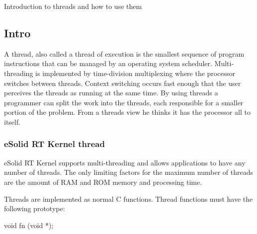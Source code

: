 Introduction to threads and how to use them

\par
\par
\par
\hypertarget{threads_threads_intro}{}\subsection{Intro}\label{threads_threads_intro}
A thread, also called a thread of execution is the smallest sequence of program instructions that can be managed by an operating system scheduler. Multi-\/threading is implemented by time-\/division multiplexing where the processor switches between threads. Context switching occurs fast enough that the user perceives the threads as running at the same time. By using threads a programmer can split the work into the threads, each responsible for a smaller portion of the problem. From a threads view he thinks it has the processor all to itself.\hypertarget{threads_kern_threads}{}\subsubsection{e\-Solid R\-T Kernel thread}\label{threads_kern_threads}
e\-Solid R\-T Kernel supports multi-\/threading and allows applications to have any number of threads. The only limiting factors for the maximum number of threads are the amount of R\-A\-M and R\-O\-M memory and processing time.

Threads are implemented as normal {\ttfamily C} functions. Thread functions must have the following prototype\-:


\begin{DoxyCode}
\textcolor{keywordtype}{void} fn (\textcolor{keywordtype}{void} *);
\end{DoxyCode}


